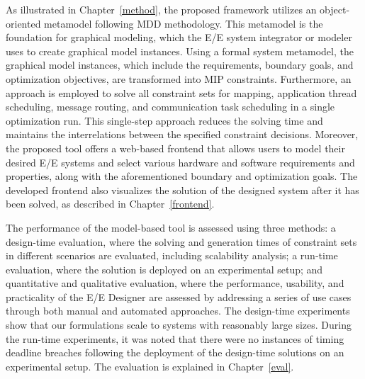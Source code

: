          
         As illustrated in Chapter~\ref{method}, the proposed framework utilizes an object-oriented metamodel following MDD methodology. This metamodel is the foundation for graphical
         modeling, which the E/E system integrator or modeler uses to create graphical model instances. 
         Using a formal system metamodel, the graphical model instances, which include the requirements, boundary goals, and optimization objectives, are transformed into MIP constraints.
         Furthermore, an approach is employed to solve all constraint sets for mapping, application thread scheduling, message routing, and communication task scheduling in a single optimization run. This single-step approach reduces the solving time and maintains the interrelations between the specified constraint decisions. Moreover, the proposed tool offers a web-based frontend that allows users to model their desired E/E systems and select various hardware and software requirements and properties, along with the aforementioned boundary and optimization goals. The developed frontend also visualizes the solution of the designed system after it has been solved, as described in Chapter~\ref{frontend}.
         
         
         

        
        
          The performance of the model-based tool is assessed using three methods: a design-time evaluation, where the solving and generation times of constraint sets in different scenarios are evaluated, including scalability analysis; a run-time evaluation, where the solution is deployed on an experimental setup; and quantitative and qualitative evaluation, where the performance, usability, and practicality of the E/E Designer are assessed by addressing a series of use cases through both manual and automated approaches.
          The design-time experiments show that our formulations scale to systems with reasonably large sizes. During the run-time experiments, it was noted that there were no instances of timing deadline breaches following the deployment of the design-time solutions on an experimental setup. The evaluation is explained in Chapter~\ref{eval}.   
        
